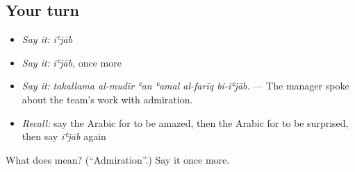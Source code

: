 \subsection*{Your turn}
\begin{itemize}
\raggedright
  \item \emph{Say it:} \emph{iʿjāb}
  \item \emph{Say it:} \emph{iʿjāb}, once more
  \item \emph{Say it:} \emph{takallama al-mudīr ʿan ʿamal al-farīq bi-iʿjāb.} — The manager spoke about the team's work with admiration.
  \item \emph{Recall:} say the Arabic for to be amazed, then the Arabic for to be surprised, then say \emph{iʿjāb} again
\end{itemize}

\begin{tcolorbox}[breakable,colback=teal!4,colframe=teal!35!black,title={Before you move on}]
What does  mean? (\textquotedblleft{}Admiration\textquotedblright{}.) Say it once more.
\end{tcolorbox}
